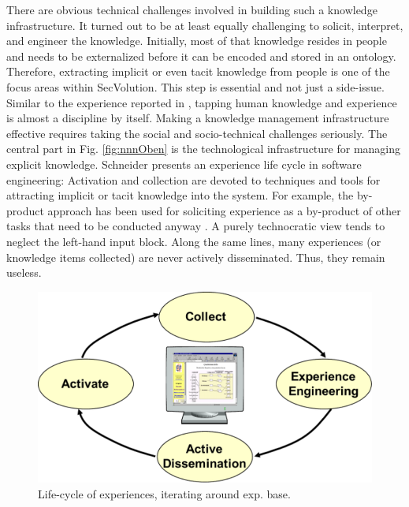 There are obvious technical challenges involved in building such a knowledge infrastructure. It turned out to be at least equally challenging to solicit, interpret, and engineer the knowledge. Initially, most of that knowledge resides in people and needs to be externalized \cite{Nonaka1995} before it can be encoded and stored in an ontology. Therefore, extracting implicit or even tacit knowledge from people is one of the focus areas within SecVolution. This step is essential and not just a side-issue. Similar to the experience reported in \cite{Schneider2009}, tapping human knowledge and experience is almost a discipline by itself. Making a knowledge management infrastructure effective requires taking the social and socio-technical challenges seriously. The central part in Fig. \ref{fig:nnnOben} is the technological infrastructure for managing explicit knowledge. Schneider presents an experience life cycle\cite{Schneider2009} in software engineering: Activation and collection are  devoted to techniques and tools for attracting implicit or tacit knowledge into the system. For example, the by-product approach has been used for soliciting experience as a by-product of other tasks that need to be conducted anyway \cite{Schneider2006}. A purely technocratic view \cite{Earl2001} tends to neglect the left-hand input block. Along the same lines, many experiences (or knowledge items collected) are never actively disseminated. Thus, they remain useless.



\begin{figure}
        \centering
    \includegraphics[width=0.7\columnwidth]{figs/nnnUnten}
    \caption{Life-cycle of experiences, iterating around exp. base.}
    \label{fig:nnnUnten}
\end{figure}


